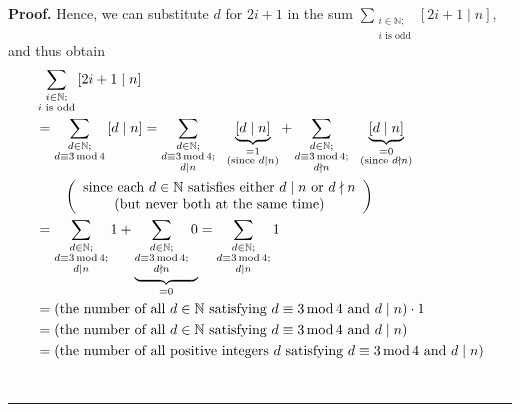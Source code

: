 \documentclass[paper=a4, fontsize=12pt]{scrartcl}%
\let\sumnonlimits\sum
\renewcommand{\sum}{\sumnonlimits\limits}
\theoremstyle{plainsl}
\theoremstyle{definition}
\theoremstyle{remark}
\newenvironment{proof}[1][Proof]{\noindent\textbf{#1.} }{\ \rule{0.5em}{0.5em}}
\begin{document}
\begin{proof}
Hence, we can substitute $d$ for $2i+1$ in the sum $\sum_{\substack{i\in
\mathbb{N};\\i\text{ is odd}}}\left[  2i+1\mid n\right]  $, and thus obtain%
\begin{align}
&  \sum_{\substack{i\in\mathbb{N};\\i\text{ is odd}}}\left[  2i+1\mid n\right]
\nonumber\\
&  =\sum_{\substack{d\in\mathbb{N};\\d\equiv3\operatorname{mod}4}}\left[
d\mid n\right]  =\sum_{\substack{d\in\mathbb{N};\\d\equiv3\operatorname{mod}%
4;\\d\mid n}}\ \ \underbrace{\left[  d\mid n\right]  }%
_{\substack{=1\\\text{(since }d\mid n\text{)}}}+\sum_{\substack{d\in
\mathbb{N};\\d\equiv3\operatorname{mod}4;\\d\nmid n}}\ \ \underbrace{\left[
d\mid n\right]  }_{\substack{=0\\\text{(since }d\nmid n\text{)}}}\nonumber\\
&  \qquad\left(
\begin{array}
[c]{c}%
\text{since each }d\in\mathbb{N}\text{ satisfies either }d\mid n\text{ or
}d\nmid n\\
\text{(but never both at the same time)}%
\end{array}
\right) \nonumber\\
&  =\sum_{\substack{d\in\mathbb{N};\\d\equiv3\operatorname{mod}4;\\d\mid
n}}1+\underbrace{\sum_{\substack{d\in\mathbb{N};\\d\equiv3\operatorname{mod}%
4;\\d\nmid n}}0}_{=0}=\sum_{\substack{d\in\mathbb{N};\\d\equiv
3\operatorname{mod}4;\\d\mid n}}1\nonumber\\
&  =\left(  \text{the number of all }d\in\mathbb{N}\text{ satisfying }%
d\equiv3\operatorname{mod}4\text{ and }d\mid n\right)  \cdot1\nonumber\\
&  =\left(  \text{the number of all }d\in\mathbb{N}\text{ satisfying }%
d\equiv3\operatorname{mod}4\text{ and }d\mid n\right) \nonumber\\
&  =\left(  \text{the number of all positive integers }d\text{ satisfying
}d\equiv3\operatorname{mod}4\text{ and }d\mid n\right) \nonumber\\

\end{align}
\end{proof}
\end{document}
